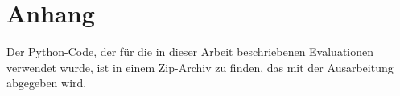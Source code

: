 \chapter*{Anhang}
Der Python-Code, der für die in dieser Arbeit beschriebenen Evaluationen verwendet wurde, ist in einem Zip-Archiv zu finden, das mit der Ausarbeitung abgegeben wird.  